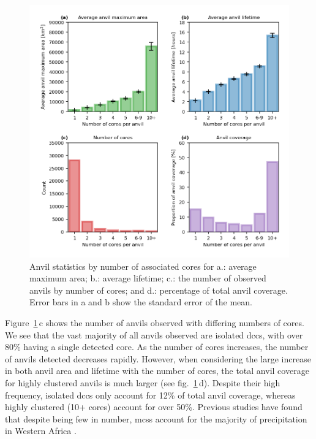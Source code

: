 \documentclass[acp, manuscript]{copernicus}
\begin{document}
\begin{figure}[tp]
    \includegraphics[width=12cm]{figures/fig06.png}
    \caption[
    Anvil statistics by number of associated cores for average maximum area, average lifetime, occurrence of anvils by number of cores, and percentage of total anvil coverage
    ]{
    Anvil statistics by number of associated cores for a.: average maximum area; b.: average lifetime; c.: the number of observed anvils by number of cores; and d.: percentage of total anvil coverage. Error bars in a and b show the standard error of the mean.
    }
    \label{fig:seviri_anvil_stats}
\end{figure}


Figure~\ref{fig:seviri_anvil_stats}\,c shows the number of anvils observed with differing numbers of cores. 
We see that the vast majority of all anvils observed are isolated \acrshort{dcc}s, with over 80\% having a single detected core. 
As the number of cores increases, the number of anvils detected decreases rapidly. 
However, when considering the large increase in both anvil area and lifetime with the number of cores, the total anvil coverage for highly clustered anvils is much larger (see fig.~\ref{fig:seviri_anvil_stats}\,d). 
Despite their high frequency, isolated \acrshort{dcc}s only account for 12\% of total anvil coverage, whereas highly clustered (10+ cores) account for over 50\%. 
Previous studies have found that despite being few in number, \acrshort{mcs}s account for the majority of precipitation in Western Africa \citep{vizy_understanding_2019}.
\end{document}

